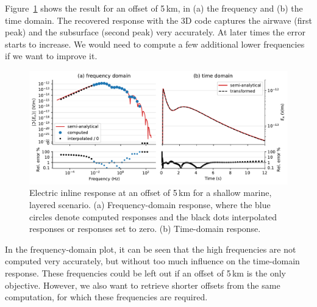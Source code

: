 \documentclass[extra, camera,%
    onecolumn,   %
    referee,     %
]{gji}
\newlength{\fwidth}
\begin{document}
Figure~\ref{fig:marine} shows the result for an offset of 5\,km, in (a) the
frequency and (b) the time domain. The recovered response with the 3D code
captures the airwave (first peak) and the subsurface (second peak) very
accurately. At later times the error starts to increase. We would need to
compute a few additional lower frequencies if we want to improve it.
%
\begin{figure}
  \centering
  \includegraphics[width=\fwidth]{06-marine}
  \caption{Electric inline response at an offset of 5\,km for a shallow marine,
    layered scenario. (a) Frequency-domain response, where the blue circles
    denote computed responses and the black dots interpolated responses or
    responses set to zero. (b) Time-domain response.}
  \label{fig:marine}
\end{figure}
%
In the frequency-domain plot, it can be seen that the high frequencies are not
computed very accurately, but without too much influence on the time-domain
response. These frequencies could be left out if an offset of 5\,km is the only
objective. However, we also want to retrieve shorter offsets from the same
computation, for which these frequencies are required.
\end{document}
